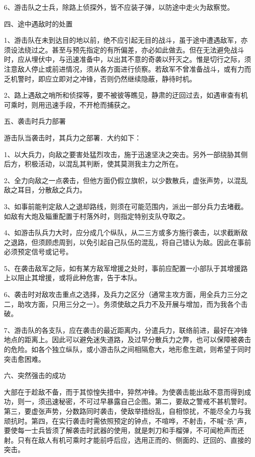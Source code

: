6、游击队之士兵，除路上侦探外，皆不应装子弹，以防途中走火为敌察觉。

四、途中遇敌时的处置

1、游击队在未到达目的地以前，绝不应引起无目的战斗，虽于途中遭遇敌军，亦须设法绕过之。甚至与预先指定的有所偏差，亦必如此做去。但在无法避免战斗时，应从埋伏中，与迅速准备中，以出其不意的奇袭以歼灭之。惟是切行之际，须注意敌人停止或前进情况，须从各方面进行侦察。若敌军不曾准备战斗，或有力而乏机警时，即应立即对之冲锋，否则仍然继续隐蔽，静待时机。

2、路上遇敌之哨所和侦探等，要不被彼等瞧见，静肃的迂回过去，如遇审查有机可乘时，则用迅速手段，不开枪而捕获之。

五、袭击时兵力部署

游击队当袭击时，其兵力之部署．大约如下：

1、以大兵力，向敌之要害处猛烈攻击，施于迅速坚决之突击。另外一部绕胁其侧后方，积极活动，以混乱其判断，使其莫测我主力之所在。

2、全力向敌之一点袭击，但他方面仍假立旗帜，以少数散兵，虚张声势，以混乱敌之耳目，分散敌之兵力。

3、如事前能判定敌人之退却路线，则须在可能范围内，派出一部分兵力去堵截。如敌有大炮及辎重配置于村落外时，则指定特别支队夺取之。

4、如游击队兵力大时，应分成几个纵队，从二三方或多方施行袭击，以求截断敌之退路，但须顾虑周到，以免引起自己队伍的混乱，将自己错认为敌。因此在事前必须预定信号或记号。

5、在袭击敌军之际，如有某方敌军增援之处时，事前应配置一小部队于其增援路上以阻止其增援，或将此种危害，告于本队。

6、袭击时对敌攻击重点之选择，及兵力之区分（通常主攻方面，用全兵力三分之二，助攻方面，只用三分之一）。务须使敌之兵力不及开展与增加，而为我各个击破。

7、游击队的各支队，应在袭击的最近距离内，分遣兵力，联络前进，最好在冲锋地点的距离上。因此可以避免迷失道路，及过早分散兵力之弊，也可以保障被袭击的危险。如各个独立纵队，或小游击队之间相隔愈大，地形愈生疏，则希望于同时突击愈困难。

六、突然强击的成功

大部在于趁敌不备，而于其惊惶失措中，猝然冲锋。为使袭击能出敌不意而得到成功，则一，须迅速秘密，不可过早暴露自己企图。第二，要敌之警戒不甚机警时。第三，要虚张声势，分数路同时袭击，使敌举措纷乱，自相惊扰，不能尽全力与我顽抗时。第四，在实行袭击时需依照预定的钟点，不喧哗，不射击，不喊“杀”声，要使每一士兵皆须了解袭击时武器的使用，就是刺刀和手榴弹，不可闻枪声而还射。只有在敌人有机可乘时才能前呼后应，选用正而的、侧面的、迂回的、直接的突击。

